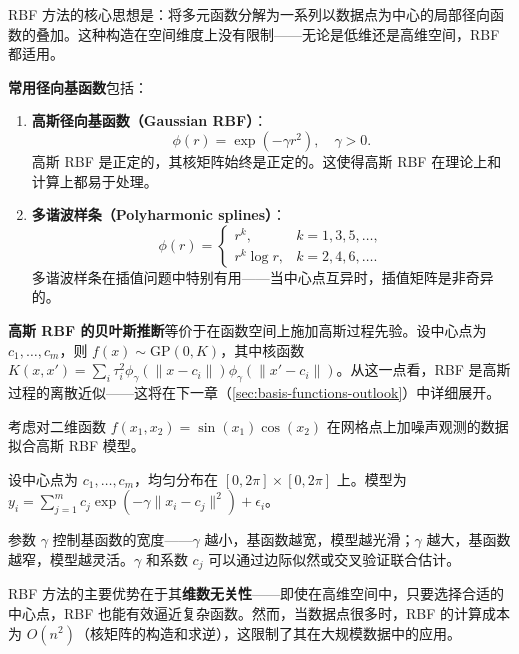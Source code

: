 RBF 方法的核心思想是：将多元函数分解为一系列以数据点为中心的局部径向函数的叠加。这种构造在空间维度上没有限制——无论是低维还是高维空间，RBF 都适用。

\textbf{常用径向基函数}包括：

\begin{enumerate}
\item \textbf{高斯径向基函数（Gaussian RBF）}：
\begin{equation}
\phi(r) = \exp(-\gamma r^2),\quad \gamma > 0.
\label{eq:gaussian-rbf}
\end{equation}
高斯 RBF 是正定的，其核矩阵始终是正定的。这使得高斯 RBF 在理论上和计算上都易于处理。

\item \textbf{多谐波样条（Polyharmonic splines）}：
\begin{equation}
\phi(r) = \begin{cases} r^k, & k = 1, 3, 5, \ldots, \\ r^k \log r, & k = 2, 4, 6, \ldots. \end{cases}
\label{eq:polyharmonic-spline}
\end{equation}
多谐波样条在插值问题中特别有用——当中心点互异时，插值矩阵是非奇异的。
\end{enumerate}

\textbf{高斯 RBF 的贝叶斯推断}等价于在函数空间上施加高斯过程先验。设中心点为 $c_1, \ldots, c_m$，则 $f(x) \sim \mathrm{GP}(0, K)$，其中核函数 $K(x, x') = \sum_i \tau_i^2 \phi_\gamma(\|x - c_i\|) \phi_\gamma(\|x' - c_i\|)$。从这一点看，RBF 是高斯过程的离散近似——这将在下一章（\cref{sec:basis-functions-outlook}）中详细展开。

\begin{Example}[高斯 RBF 回归]\label{ex:rbf-regression}
考虑对二维函数 $f(x_1, x_2) = \sin(x_1) \cos(x_2)$ 在网格点上加噪声观测的数据拟合高斯 RBF 模型。

设中心点为 $c_1, \ldots, c_m$，均匀分布在 $[0, 2\pi] \times [0, 2\pi]$ 上。模型为 $y_i = \sum_{j=1}^{m} c_j \exp(-\gamma \|x_i - c_j\|^2) + \epsilon_i$。

参数 $\gamma$ 控制基函数的宽度——$\gamma$ 越小，基函数越宽，模型越光滑；$\gamma$ 越大，基函数越窄，模型越灵活。$\gamma$ 和系数 $c_j$ 可以通过边际似然或交叉验证联合估计。
\end{Example}

RBF 方法的主要优势在于其\textbf{维数无关性}——即使在高维空间中，只要选择合适的中心点，RBF 也能有效逼近复杂函数。然而，当数据点很多时，RBF 的计算成本为 $O(n^2)$（核矩阵的构造和求逆），这限制了其在大规模数据中的应用。

